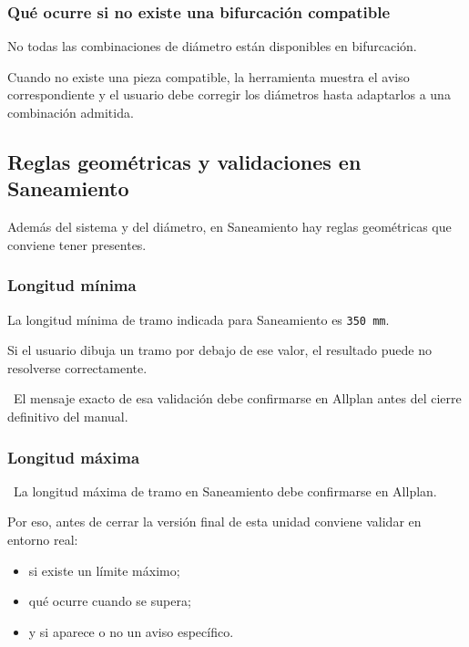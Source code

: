 
\subsubsection{Qué ocurre si no existe una bifurcación compatible}

No todas las combinaciones de diámetro están disponibles en bifurcación.

Cuando no existe una pieza compatible, la herramienta muestra el aviso correspondiente y el usuario debe corregir los diámetros hasta adaptarlos a una combinación admitida.

\subsection{Reglas geométricas y validaciones en Saneamiento}

Además del sistema y del diámetro, en Saneamiento hay reglas geométricas que conviene tener presentes.

\subsubsection{Longitud mínima}

La longitud mínima de tramo indicada para Saneamiento es \texttt{350 mm}.

Si el usuario dibuja un tramo por debajo de ese valor, el resultado puede no resolverse correctamente.

\pendingtag\ El mensaje exacto de esa validación debe confirmarse en Allplan antes del cierre definitivo del manual.

\subsubsection{Longitud máxima}

\pendingtag\ La longitud máxima de tramo en Saneamiento debe confirmarse en Allplan.

Por eso, antes de cerrar la versión final de esta unidad conviene validar en entorno real:

\begin{itemize}
\item si existe un límite máximo;
\item qué ocurre cuando se supera;
\item y si aparece o no un aviso específico.
\end{itemize}

